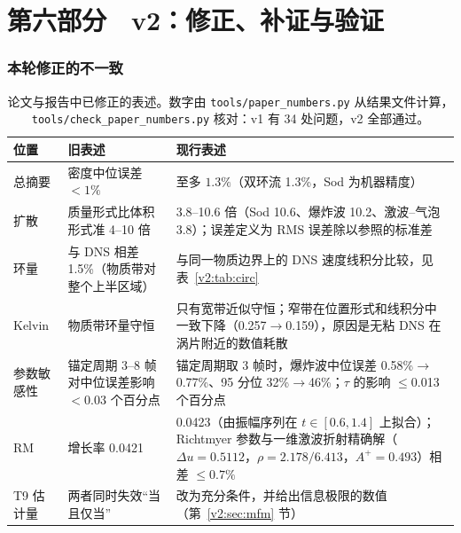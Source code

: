 \clearpage\part{第六部分　v2：修正、补证与验证}
\noindent{}

\section{本轮修正的不一致}
\begin{table}[!htbp]\centering\small\caption{论文与报告中已修正的表述。数字由 \texttt{tools/paper\_numbers.py} 从结果文件计算，\texttt{tools/check\_paper\_numbers.py} 核对：v1 有 34 处问题，v2 全部通过。}
\begin{tabularx}{\linewidth}{@{}l L L@{}}\toprule
位置 & 旧表述 & 现行表述\\\midrule
总摘要 & 密度中位误差 $<1\%$ & 至多 $1.3\%$（双环流 1.3\%，Sod 为机器精度）\\
扩散 & 质量形式比体积形式准 4–10 倍 & 3.8--10.6 倍（Sod 10.6、爆炸波 10.2、激波–气泡 3.8）；误差定义为 RMS 误差除以参照的标准差\\
环量 & 与 DNS 相差 1.5\%（物质带对整个上半区域） & 与同一物质边界上的 DNS 速度线积分比较，见表~\ref{v2:tab:circ}\\
Kelvin & 物质带环量守恒 & 只有宽带近似守恒；窄带在位置形式和线积分中一致下降（0.257$\to$0.159），原因是无粘 DNS 在涡片附近的数值耗散\\
参数敏感性 & 锚定周期 3–8 帧对中位误差影响 $<0.03$ 个百分点 & 锚定周期取 3 帧时，爆炸波中位误差 0.58\%$\to$0.77\%、95 分位 32\%$\to$46\%；$\tau$ 的影响 $\le$0.013 个百分点\\
RM & 增长率 0.0421 & 0.0423（由振幅序列在 $t\in[0.6,1.4]$ 上拟合）；Richtmyer 参数与一维激波折射精确解（$\Delta u=0.5112$，$\rho=2.178/6.413$，$A^+=0.493$）相差 $\le0.7\%$\\
T9 估计量 & 两者同时失效“当且仅当” & 改为充分条件，并给出信息极限的数值（第~\ref{v2:sec:mfm} 节）\\\bottomrule
\end{tabularx}\end{table}

